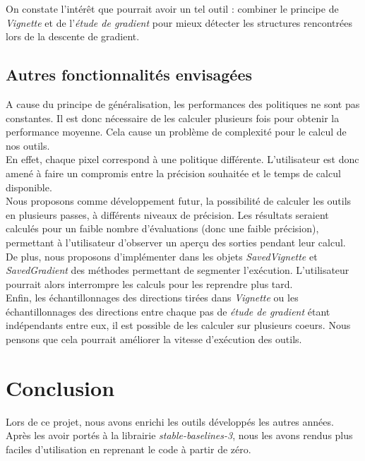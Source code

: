 \documentclass[12pt]{article}
\begin{document}
On constate l'intérêt que pourrait avoir un tel outil : combiner le principe de \emph{Vignette} et de l'\emph{étude de gradient} pour mieux détecter les structures rencontrées lors de la descente de gradient. \\

\subsection{Autres fonctionnalités envisagées}

A cause du principe de généralisation, les performances des politiques ne sont pas constantes. Il est donc nécessaire de les calculer plusieurs fois pour obtenir la performance moyenne. Cela cause un problème de complexité pour le calcul de nos outils. \\

En effet, chaque pixel correspond à une politique différente. L'utilisateur est donc amené à faire un compromis entre la précision souhaitée et le temps de calcul disponible. \\

Nous proposons comme développement futur, la possibilité de calculer les outils en plusieurs passes, à différents niveaux de précision. Les résultats seraient calculés pour un faible nombre d'évaluations (donc une faible précision), permettant à l'utilisateur d'observer un aperçu des sorties pendant leur calcul. \\

De plus, nous proposons d'implémenter dans les objets \emph{SavedVignette} et \emph{SavedGradient} des méthodes permettant de segmenter l'exécution. L'utilisateur pourrait alors interrompre les calculs pour les reprendre plus tard. \\

Enfin, les échantillonnages des directions tirées dans \emph{Vignette} ou les échantillonnages des directions entre chaque pas de \emph{étude de gradient} étant indépendants entre eux, il est possible de les calculer sur plusieurs coeurs. Nous pensons que cela pourrait améliorer la vitesse d'exécution des outils. \\

\newpage
\section*{Conclusion}

Lors de ce projet, nous avons enrichi les outils développés les autres années. Après les avoir portés à la librairie \emph{stable-baselines-3}, nous les avons rendus plus faciles d'utilisation en reprenant le code à partir de zéro. \\
\end{document}
